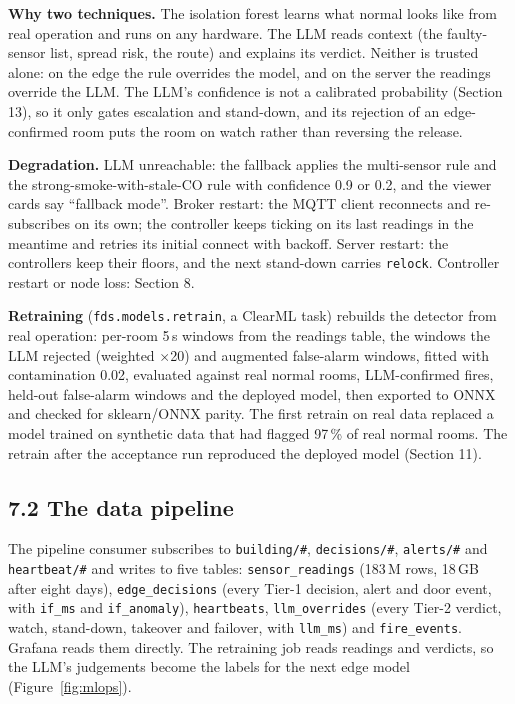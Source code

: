 \documentclass[11pt]{article}
\begin{document}
\textbf{Why two techniques.} The isolation forest learns what normal looks like from real 
operation and runs on any hardware. The LLM reads context (the faulty-sensor list, spread risk, 
the route) and explains its verdict. Neither is trusted alone: on the edge the rule overrides the 
model, and on the server the readings override the LLM. The LLM's confidence is not a calibrated 
probability (Section 13), so it only gates escalation and stand-down, and its rejection of an 
edge-confirmed room puts the room on watch rather than reversing the release.

\textbf{Degradation.} LLM unreachable: the fallback applies the multi-sensor rule and the 
strong-smoke-with-stale-CO rule with confidence 0.9 or 0.2, and the viewer cards say 
``fallback mode''. Broker restart: the MQTT client reconnects and re-subscribes on its own; 
the controller keeps ticking on its last readings in the meantime and retries its initial connect 
with backoff. Server restart: the controllers keep their floors, and the next stand-down 
carries \texttt{relock}. Controller restart or node loss: Section 8.

\textbf{Retraining} (\texttt{fds.models.retrain}, a ClearML task) rebuilds the detector from real 
operation: per-room 5\,s windows from the readings table, the windows the LLM rejected (weighted 
$\times$20) and augmented false-alarm windows, fitted with contamination 0.02, evaluated against 
real normal rooms, LLM-confirmed fires, held-out false-alarm windows and the deployed model, then 
exported to ONNX and checked for sklearn/ONNX parity. The first retrain on real data replaced a 
model trained on synthetic data that had flagged 97\,\% of real normal rooms. The retrain after 
the acceptance run reproduced the deployed model (Section 11).

\subsection{7.2 The data pipeline}

The pipeline consumer subscribes to \texttt{building/\#}, \texttt{decisions/\#}, \texttt{alerts/\#} 
and \texttt{heartbeat/\#} and writes to five tables: \texttt{sensor\_readings} (183\,M rows, 
18\,GB after eight days), \texttt{edge\_decisions} (every Tier-1 decision, alert and door event, 
with \texttt{if\_ms} and \texttt{if\_anomaly}), \texttt{heartbeats}, \texttt{llm\_overrides} 
(every Tier-2 verdict, watch, stand-down, takeover and failover, with \texttt{llm\_ms}) and 
\texttt{fire\_events}. Grafana reads them directly. The retraining job reads readings and 
verdicts, so the LLM's judgements become the labels for the next edge model 
(Figure~\ref{fig:mlops}).
\end{document}
